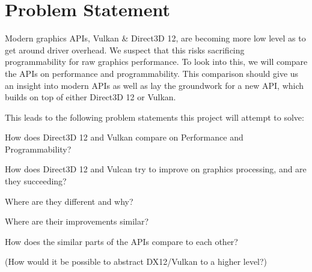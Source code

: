 \section{Problem Statement}\label{sec:problem_statement}
\begin{sectionmeta}

Modern graphics APIs, Vulkan \& Direct3D 12, are becoming more low level as to get around driver overhead. 
We suspect that this risks sacrificing programmability for raw graphics performance. 
To look into this, we will compare the APIs on performance and programmability. 
This comparison should give us an insight into modern APIs as well as lay the groundwork for a new API, which builds on top of either Direct3D 12 or Vulkan.

This leads to the following problem statements this project will attempt to solve:

How does Direct3D 12 and Vulkan compare on Performance and Programmability?

How does Direct3D 12 and Vulcan try to improve on graphics processing, and are they succeeding?

Where are they different and why?

Where are their improvements similar? 

How does the similar parts of the APIs compare to each other?

(How would it be possible to abstract DX12/Vulkan to a higher level?)

\end{sectionmeta}